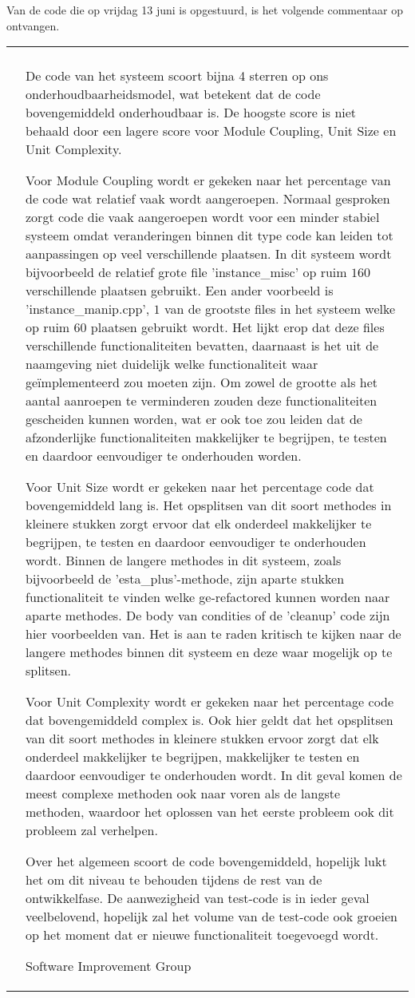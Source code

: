 Van de code die op vrijdag 13 juni is opgestuurd, is het volgende commentaar op ontvangen.

\begin{tabular}{p{0.5cm} | p{\textwidth - 2cm} |}
\cline{2-2}
 & \\ & \setlength{\parskip}{5pt}
De code van het systeem scoort bijna 4 sterren op ons onderhoudbaarheidsmodel, wat betekent dat de code bovengemiddeld onderhoudbaar is. De hoogste score is niet behaald door een lagere score voor Module Coupling, Unit Size en Unit Complexity.

Voor Module Coupling wordt er gekeken naar het percentage van de code wat relatief vaak wordt aangeroepen. Normaal gesproken zorgt code die vaak aangeroepen wordt voor een minder stabiel systeem omdat veranderingen binnen dit type code kan leiden tot aanpassingen op veel verschillende plaatsen. In dit systeem wordt bijvoorbeeld de relatief grote file 'instance\_misc' op ruim $160$ verschillende plaatsen gebruikt. Een ander voorbeeld is 'instance\_manip.cpp', $1$ van de grootste files in het systeem welke op ruim $60$ plaatsen gebruikt wordt. Het lijkt erop dat deze files verschillende functionaliteiten bevatten, daarnaast is het uit de naamgeving niet duidelijk welke functionaliteit waar geïmplementeerd zou moeten zijn. Om zowel de grootte als het aantal aanroepen te verminderen zouden deze functionaliteiten gescheiden kunnen worden, wat er ook toe zou leiden dat de afzonderlijke functionaliteiten makkelijker te begrijpen, te testen en daardoor eenvoudiger te onderhouden worden.

Voor Unit Size wordt er gekeken naar het percentage code dat bovengemiddeld lang is. Het opsplitsen van dit soort methodes in kleinere stukken zorgt ervoor dat elk onderdeel makkelijker te begrijpen, te testen en daardoor eenvoudiger te onderhouden wordt. Binnen de langere methodes in dit systeem, zoals bijvoorbeeld de 'esta\_plus'-methode, zijn aparte stukken functionaliteit te vinden welke ge-refactored kunnen worden naar aparte methodes. De body van condities of de 'cleanup' code zijn hier voorbeelden van. Het is aan te raden kritisch te kijken naar de langere methodes binnen dit systeem en deze waar mogelijk op te splitsen.

Voor Unit Complexity wordt er gekeken naar het percentage code dat bovengemiddeld complex is. Ook hier geldt dat het opsplitsen van dit soort methodes in kleinere stukken ervoor zorgt dat elk onderdeel makkelijker te begrijpen, makkelijker te testen en daardoor eenvoudiger te onderhouden wordt. In dit geval komen de meest complexe methoden ook naar voren als de langste methoden, waardoor het oplossen van het eerste probleem ook dit probleem zal verhelpen.

Over het algemeen scoort de code bovengemiddeld, hopelijk lukt het om dit niveau te behouden tijdens de rest van de ontwikkelfase. De aanwezigheid van test-code is in ieder geval veelbelovend, hopelijk zal het volume van de test-code ook groeien op het moment dat er nieuwe functionaliteit toegevoegd wordt. 

\hfill Software Improvement Group \\
\cline{2-2}
\end{tabular}
